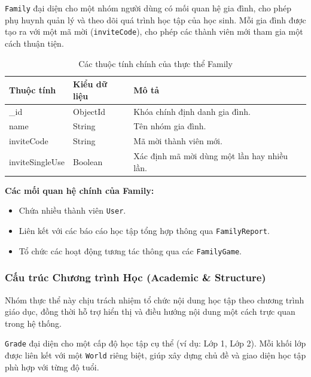 \texttt{Family} đại diện cho một nhóm người dùng có mối quan hệ gia đình, cho phép phụ huynh quản lý và theo dõi quá trình học tập của học sinh. 
Mỗi gia đình được tạo ra với một mã mời (\texttt{inviteCode}), cho phép các thành viên mới tham gia một cách thuận tiện.

\begin{table}[H]
	\centering
	\begin{tabularx}{\textwidth}{|l|l|X|}
		\hline
		\textbf{Thuộc tính} & \textbf{Kiểu dữ liệu} & \textbf{Mô tả} \\ \hline
		\_id & ObjectId & Khóa chính định danh gia đình. \\ \hline
		name & String & Tên nhóm gia đình. \\ \hline
		inviteCode & String & Mã mời thành viên mới. \\ \hline
		inviteSingleUse & Boolean & Xác định mã mời dùng một lần hay nhiều lần. \\ \hline
	\end{tabularx}
	\caption{Các thuộc tính chính của thực thể Family}
\end{table}

\newline
\textbf{Các mối quan hệ chính của Family:}
\begin{itemize}
	\item Chứa nhiều thành viên \texttt{User}.
	\item Liên kết với các báo cáo học tập tổng hợp thông qua \texttt{FamilyReport}.
	\item Tổ chức các hoạt động tương tác thông qua các \texttt{FamilyGame}.
\end{itemize}

\subsubsection{Cấu trúc Chương trình Học (Academic \& Structure)}
Nhóm thực thể này chịu trách nhiệm tổ chức nội dung học tập theo chương trình giáo dục, đồng thời hỗ trợ hiển thị và điều hướng nội dung một cách trực quan trong hệ thống.


\texttt{Grade} đại diện cho một cấp độ học tập cụ thể (ví dụ: Lớp 1, Lớp 2). 
Mỗi khối lớp được liên kết với một \texttt{World} riêng biệt, giúp xây dựng chủ đề và giao diện học tập phù hợp với từng độ tuổi.

